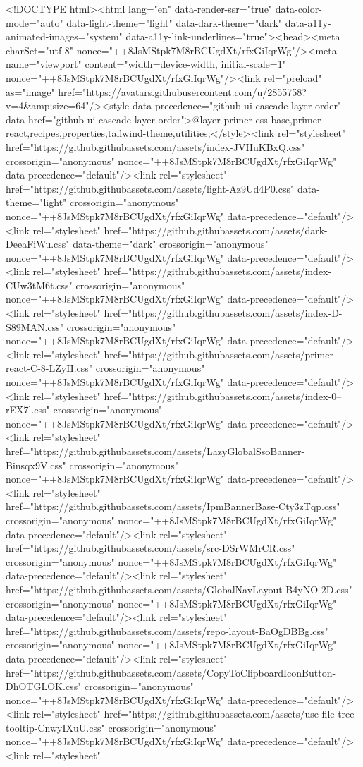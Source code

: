 <!DOCTYPE html><html lang="en" data-render-ssr="true" data-color-mode="auto" data-light-theme="light" data-dark-theme="dark" data-a11y-animated-images="system" data-a11y-link-underlines="true"><head><meta charSet="utf-8" nonce="++8JsMStpk7M8rBCUgdXt/rfxGiIqrWg"/><meta name="viewport" content="width=device-width, initial-scale=1" nonce="++8JsMStpk7M8rBCUgdXt/rfxGiIqrWg"/><link rel="preload" as="image" href="https://avatars.githubusercontent.com/u/2855758?v=4&amp;size=64"/><style data-precedence="github-ui-cascade-layer-order" data-href="github-ui-cascade-layer-order">@layer primer-css-base,primer-react,recipes,properties,tailwind-theme,utilities;</style><link rel="stylesheet" href="https://github.githubassets.com/assets/index-JVHuKBxQ.css" crossorigin="anonymous" nonce="++8JsMStpk7M8rBCUgdXt/rfxGiIqrWg" data-precedence="default"/><link rel="stylesheet" href="https://github.githubassets.com/assets/light-Az9Ud4P0.css" data-theme="light" crossorigin="anonymous" nonce="++8JsMStpk7M8rBCUgdXt/rfxGiIqrWg" data-precedence="default"/><link rel="stylesheet" href="https://github.githubassets.com/assets/dark-DeeaFiWu.css" data-theme="dark" crossorigin="anonymous" nonce="++8JsMStpk7M8rBCUgdXt/rfxGiIqrWg" data-precedence="default"/><link rel="stylesheet" href="https://github.githubassets.com/assets/index-CUw3tM6t.css" crossorigin="anonymous" nonce="++8JsMStpk7M8rBCUgdXt/rfxGiIqrWg" data-precedence="default"/><link rel="stylesheet" href="https://github.githubassets.com/assets/index-D-S89MAN.css" crossorigin="anonymous" nonce="++8JsMStpk7M8rBCUgdXt/rfxGiIqrWg" data-precedence="default"/><link rel="stylesheet" href="https://github.githubassets.com/assets/primer-react-C-8-LZyH.css" crossorigin="anonymous" nonce="++8JsMStpk7M8rBCUgdXt/rfxGiIqrWg" data-precedence="default"/><link rel="stylesheet" href="https://github.githubassets.com/assets/index-0--rEX7l.css" crossorigin="anonymous" nonce="++8JsMStpk7M8rBCUgdXt/rfxGiIqrWg" data-precedence="default"/><link rel="stylesheet" href="https://github.githubassets.com/assets/LazyGlobalSsoBanner-Binsqx9V.css" crossorigin="anonymous" nonce="++8JsMStpk7M8rBCUgdXt/rfxGiIqrWg" data-precedence="default"/><link rel="stylesheet" href="https://github.githubassets.com/assets/IpmBannerBase-Cty3zTqp.css" crossorigin="anonymous" nonce="++8JsMStpk7M8rBCUgdXt/rfxGiIqrWg" data-precedence="default"/><link rel="stylesheet" href="https://github.githubassets.com/assets/src-DSrWMrCR.css" crossorigin="anonymous" nonce="++8JsMStpk7M8rBCUgdXt/rfxGiIqrWg" data-precedence="default"/><link rel="stylesheet" href="https://github.githubassets.com/assets/GlobalNavLayout-B4yNO-2D.css" crossorigin="anonymous" nonce="++8JsMStpk7M8rBCUgdXt/rfxGiIqrWg" data-precedence="default"/><link rel="stylesheet" href="https://github.githubassets.com/assets/repo-layout-BaOgDBBg.css" crossorigin="anonymous" nonce="++8JsMStpk7M8rBCUgdXt/rfxGiIqrWg" data-precedence="default"/><link rel="stylesheet" href="https://github.githubassets.com/assets/CopyToClipboardIconButton-DhOTGLOK.css" crossorigin="anonymous" nonce="++8JsMStpk7M8rBCUgdXt/rfxGiIqrWg" data-precedence="default"/><link rel="stylesheet" href="https://github.githubassets.com/assets/use-file-tree-tooltip-CnwyIXuU.css" crossorigin="anonymous" nonce="++8JsMStpk7M8rBCUgdXt/rfxGiIqrWg" data-precedence="default"/><link rel="stylesheet" 